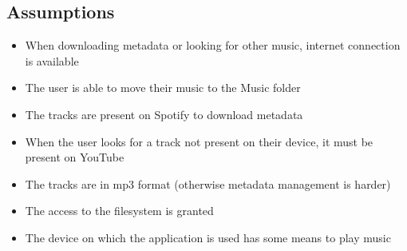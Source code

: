 \documentclass{article}
\begin{document}
\subsection{Assumptions}
\begin{itemize}
    \item When downloading metadata or looking for other music, internet
        connection is available
    \item The user is able to move their music to the Music folder
    \item The tracks are present on Spotify to download metadata
    \item When the user looks for a track not present on their device, it must
        be present on YouTube
    \item The tracks are in mp3 format (otherwise metadata management is harder)
    \item The access to the filesystem is granted
    \item The device on which the application is used has some means to 
        play music
\end{itemize}
\end{document}

